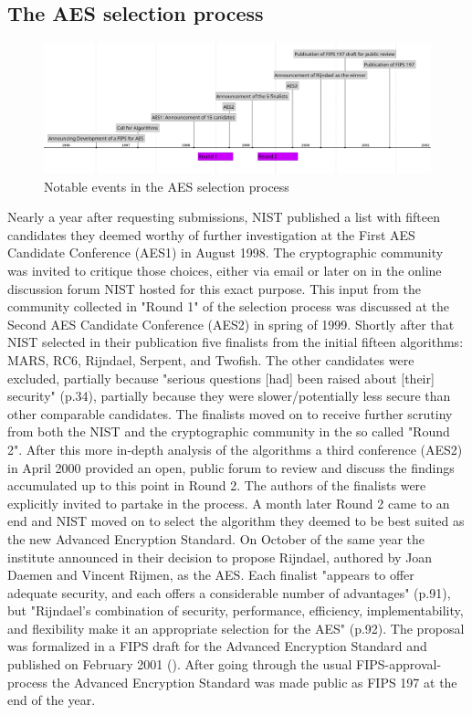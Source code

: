 \subsection{The \ac{AES} selection process}
\label{ch:aes}

\begin{figure}
  \centering
  \includegraphics[scale=0.37]{data/figures/aes-process-timeline.png}
  \caption{Notable events in the \ac{AES} selection process}
  \label{fig:procestimeline}
\end{figure}

Nearly a year after requesting submissions, \ac{NIST} published a list with fifteen candidates they deemed worthy of further investigation at the First \ac{AES} Candidate Conference (AES1) in August 1998. The cryptographic community was invited to critique those choices, either via email or later on in the online discussion forum \ac{NIST} hosted for this exact purpose. This input from the community collected in "Round 1" of the selection process was discussed at the Second \ac{AES} Candidate Conference (AES2) in spring of 1999. Shortly after that \ac{NIST} selected in their publication \cite{round1report} five finalists from the initial fifteen algorithms: MARS, RC6, Rijndael, Serpent, and Twofish.
The other candidates were excluded, partially because "serious questions [had] been raised about [their] security" (p.34), partially because they were slower/potentially less secure than other comparable candidates.
The finalists moved on to receive further scrutiny from both the \ac{NIST} and the cryptographic community in the so called "Round 2".
After this more in-depth analysis of the algorithms a third conference (AES2) in April 2000 provided an open, public forum to review and discuss the findings accumulated up to this point in Round 2. The authors of the finalists were explicitly invited to partake in the process. A month later Round 2 came to an end and \ac{NIST} moved on to select the algorithm they deemed to be best suited as the new Advanced Encryption Standard.
On October of the same year the institute announced in \cite{round2report} their decision to propose Rijndael, authored by Joan Daemen and Vincent Rijmen, as the \ac{AES}. Each finalist "appears  to  offer adequate security, and each offers a considerable number of advantages" (p.91), but "Rijndael’s combination of security, performance, efficiency, implementability, and flexibility make it an appropriate selection for the AES" (p.92).
The proposal was formalized in a \ac{FIPS} draft for the Advanced Encryption Standard and published on February 2001 (\cite{fipsdraft}). After going through the usual \ac{FIPS}-approval-process the Advanced Encryption Standard was made public as \ac{FIPS} 197 \cite{fips197} at the end of the year.

